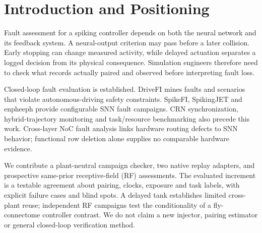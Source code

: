 \section{Introduction and Positioning}
Fault assessment for a spiking controller depends on both the neural network and its feedback system. A neural-output criterion may pass before a later collision. Early stopping can change measured activity, while delayed actuation separates a logged decision from its physical consequence. Simulation engineers therefore need to check what records actually paired and observed before interpreting fault loss.

Closed-loop fault evaluation is established. DriveFI mines faults and scenarios that violate autonomous-driving safety constraints\cite{jha2019drivefi}. SpikeFI, SpikingJET and enpheeph provide configurable SNN fault campaigns\cite{spyrou2024spikefi,gogebakan2024spikingjet,colucci2022enpheeph}. CRN synchronization\cite{glasserman1992crn}, hybrid-trajectory monitoring\cite{donze2010breach} and task/resource benchmarking\cite{yik2023neurobench,dangelo2026embodied} also precede this work. Cross-layer NoC fault analysis links hardware routing defects to SNN behavior\cite{chessa2026crosslayer}; functional row deletion alone supplies no comparable hardware evidence.

We contribute a plant-neutral campaign checker, two native replay adapters, and prospective same-prior receptive-field (RF) assessments. The evaluated increment is a testable agreement about pairing, clocks, exposure and task labels, with explicit failure cases and blind spots. A delayed tank establishes limited cross-plant reuse; independent RF campaigns test the conditionality of a fly-connectome controller contrast. We do not claim a new injector, pairing estimator or general closed-loop verification method.
